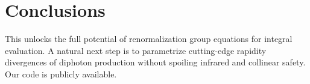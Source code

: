 \section{Conclusions}\label{sec:conclusions}

This unlocks the full potential of renormalization group equations for
integral evaluation. A natural next step is to parametrize cutting-edge
rapidity divergences of diphoton production without spoiling infrared
and collinear safety. Our code is publicly available.

